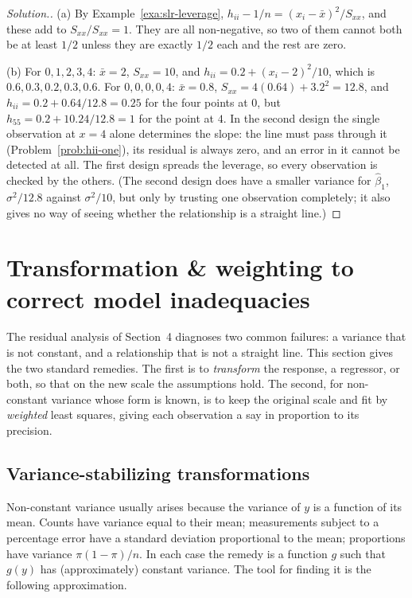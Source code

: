 \documentclass[11pt,a4paper]{article}
\numberwithin{equation}{section}
\theoremstyle{definition}
\newenvironment{solution}
  {\renewcommand{\qedsymbol}{}\begin{proof}[\textit{Solution}.]}
  {\end{proof}}
\begin{document}
\begin{solution}
(a) By Example~\ref{exa:slr-leverage}, $h_{ii} - 1/n = (x_i - \bar x)^2/S_{xx}$, and these add
to $S_{xx}/S_{xx} = 1$. They are all non-negative, so two of them cannot both be at least $1/2$
unless they are exactly $1/2$ each and the rest are zero.

(b) For $0, 1, 2, 3, 4$: $\bar x = 2$, $S_{xx} = 10$, and $h_{ii} = 0.2 + (x_i - 2)^2/10$, which is
$0.6, 0.3, 0.2, 0.3, 0.6$. For $0, 0, 0, 0, 4$: $\bar x = 0.8$, $S_{xx} = 4(0.64) + 3.2^2 = 12.8$, and
$h_{ii} = 0.2 + 0.64/12.8 = 0.25$ for the four points at $0$, but
$h_{55} = 0.2 + 10.24/12.8 = 1$ for the point at $4$. In the second design the single
observation at $x = 4$ alone determines the slope: the line must pass through it
(Problem~\ref{prob:hii-one}), its residual is always zero, and an error in it cannot be
detected at all. The first design spreads the leverage, so every observation is checked by the
others. (The second design does have a smaller variance for $\hat\beta_1$,
$\sigma^2/12.8$ against $\sigma^2/10$, but only by trusting one observation completely; it also
gives no way of seeing whether the relationship is a straight line.)
\end{solution}

\section{Transformation \& weighting to correct model inadequacies}
The residual analysis of Section~4 diagnoses two common failures: a variance that is not
constant, and a relationship that is not a straight line. This section gives the two
standard remedies. The first is to \emph{transform} the response, a regressor, or both, so
that on the new scale the assumptions hold. The second, for non-constant variance whose form
is known, is to keep the original scale and fit by \emph{weighted} least squares, giving each
observation a say in proportion to its precision.

\subsection{Variance-stabilizing transformations}
Non-constant variance usually arises because the variance of $y$ is a function of its mean.
Counts have variance equal to their mean; measurements subject to a percentage error have a
standard deviation proportional to the mean; proportions have variance
$\pi(1 - \pi)/n$. In each case the remedy is a function $g$ such that $g(y)$ has
(approximately) constant variance. The tool for finding it is the following approximation.
\end{document}
